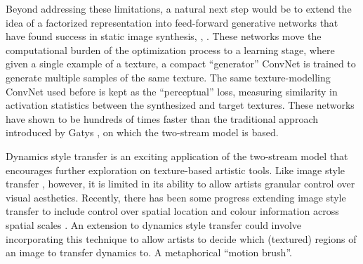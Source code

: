 Beyond addressing these limitations, a natural next step would be
to extend the idea of a factorized representation into feed-forward
generative networks that have found success in static image
synthesis, \eg, \cite{johnson2016,ulyanov2016}. These networks move the computational burden of the optimization process to a learning stage, where given a single example of a texture, a compact ``generator'' ConvNet is trained to generate multiple samples of the same texture. The same texture-modelling ConvNet used before is kept as the ``perceptual'' loss, measuring similarity in activation statistics between the synthesized and target textures. These networks have shown to be hundreds of times faster than the traditional approach introduced by Gatys \etal \cite{gatys2015}, on which the two-stream model is based.

Dynamics style transfer is an exciting application of the two-stream model that encourages further exploration on texture-based artistic tools. Like image style transfer \cite{gatys2016image}, however, it is limited in its ability to allow artists granular control over visual aesthetics. Recently, there has been some progress extending image style transfer to include control over spatial location and colour information across spatial scales \cite{gatys2017}. An extension to dynamics style transfer could involve incorporating this technique to allow artists to decide which (textured) regions of an image to transfer dynamics to. A metaphorical ``motion brush''.